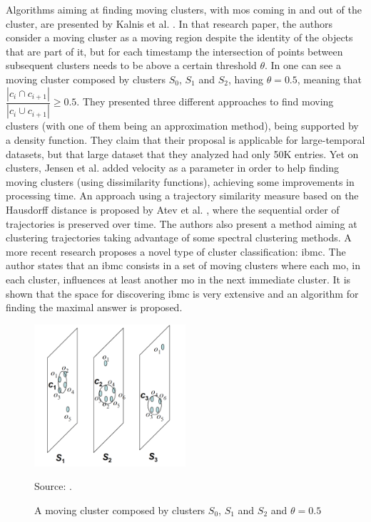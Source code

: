 Algorithms aiming at finding moving clusters, with \acp{mo} coming in and out of the cluster, are presented by Kalnis et
al. \citep{movingclusters}. In that research paper, the authors consider a moving cluster as a moving region despite the
identity of the objects that are part of it, but for each timestamp the intersection of points between subsequent
clusters needs to be above a certain threshold $\theta$. In  one can see a moving cluster composed
by clusters $S_0$, $S_1$ and $S_2$, having $\theta=0.5$, meaning that $\dfrac{|c_i \cap c_{i+1}|}{|c_i \cup c_{i+1}|}
\geq 0.5$. They presented three different approaches to find moving clusters (with one of them being an approximation
method), being supported by a density function. They claim that their proposal is applicable for large-temporal
datasets, but that large dataset that they analyzed had only 50K entries. Yet on clusters, Jensen et al.
\citep{clusters3} added velocity as a parameter in order to help finding moving clusters (using dissimilarity
functions), achieving some improvements in processing time. An approach using a trajectory similarity measure based on
the Hausdorff distance is proposed by Atev et al. \citep{clusters2}, where the sequential order of trajectories is
preserved over time. The authors also present a method aiming at clustering trajectories taking advantage of some
spectral clustering methods. A more recent research \citep{clusters1} proposes a novel type of cluster classification:
\ac{ibmc}. The author states that an \ac{ibmc} consists in a set of moving clusters where each \ac{mo}, in each cluster,
influences at least another \ac{mo} in the next immediate cluster. It is shown that the space for discovering \ac{ibmc}
is very extensive and an algorithm for finding the maximal answer is proposed.

\begin{figure}
    \centering
    \caption{A moving cluster composed by clusters $S_0$, $S_1$ and $S_2$ and $\theta=0.5$}
    \centerline{\includegraphics[width=0.5\textwidth]{images/clusters.png}}
    \footnotesize{Source: \citep{movingclusters}.}
    \label{fig:clusters}
\end{figure}

